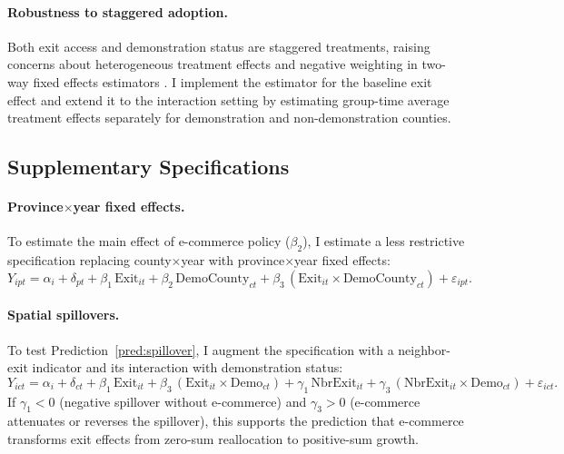 \documentclass[12pt]{article}
\begin{document}
\paragraph{Robustness to staggered adoption.} Both exit access and demonstration status are staggered treatments, raising concerns about heterogeneous treatment effects and negative weighting in two-way fixed effects estimators \citep{dechaisemartin2020,sun2021}. I implement the \citet{callaway2021} estimator for the baseline exit effect and extend it to the interaction setting by estimating group-time average treatment effects separately for demonstration and non-demonstration counties.

\subsection{Supplementary Specifications}

\paragraph{Province$\times$year fixed effects.} To estimate the main effect of e-commerce policy ($\beta_2$), I estimate a less restrictive specification replacing county$\times$year with province$\times$year fixed effects:
\begin{equation}
    Y_{ipt} = \alpha_i + \delta_{pt} + \beta_1 \, \text{Exit}_{it} + \beta_2 \, \text{DemoCounty}_{ct} + \beta_3 \, (\text{Exit}_{it} \times \text{DemoCounty}_{ct}) + \varepsilon_{ipt}.
\end{equation}

\paragraph{Spatial spillovers.} To test Prediction~\ref{pred:spillover}, I augment the specification with a neighbor-exit indicator and its interaction with demonstration status:
\begin{equation}
    Y_{ict} = \alpha_i + \delta_{ct} + \beta_1 \, \text{Exit}_{it} + \beta_3 \, (\text{Exit}_{it} \times \text{Demo}_{ct}) + \gamma_1 \, \text{NbrExit}_{it} + \gamma_3 \, (\text{NbrExit}_{it} \times \text{Demo}_{ct}) + \varepsilon_{ict}.
\end{equation}
If $\gamma_1 < 0$ (negative spillover without e-commerce) and $\gamma_3 > 0$ (e-commerce attenuates or reverses the spillover), this supports the prediction that e-commerce transforms exit effects from zero-sum reallocation to positive-sum growth.
\end{document}
